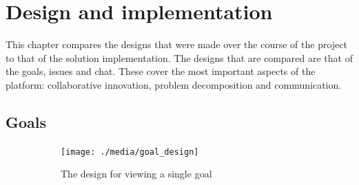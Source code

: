 \chapter{Design and implementation}

This chapter compares the designs that were made over the course of the project to that of the solution implementation. The designs that are compared are that of the goals, issues and chat. These cover the most important aspects of the platform: collaborative innovation, problem decomposition and communication.

\section{Goals}

\begin{figure}[ht!]
    \centering
    \begin{subfigure}[b]{0.45\textwidth}
        \texttt{[image: ./media/goal\_design]}
        \caption{The design for viewing a single goal}
        \label{fig:goal-design}
    \end{subfigure}
    ~ %
    \begin{subfigure}[b]{0.45\textwidth}
        \centering

\end{subfigure}
\end{figure}

